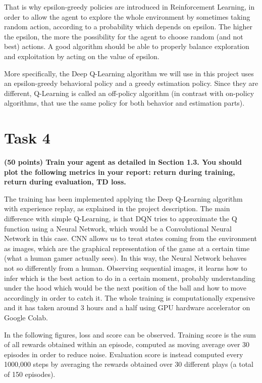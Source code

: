 \documentclass[12pt]{article}
\begin{document}
That is why epsilon-greedy policies are introduced in Reinforcement Learning, in order to allow the agent to explore the whole environment by sometimes taking random action, according to a probability which depends on epsilon. The higher the epsilon, the more the possibility for the agent to choose random (and not best) actions. A good algorithm should be able to properly balance exploration and exploitation by acting on the value of epsilon.

More specifically, the Deep Q-Learning algorithm we will use in this project uses an epsilon-greedy behavioral policy and a greedy estimation policy. Since they are different, Q-Learning is called an off-policy algorithm (in contrast with on-policy algorithms, that use the same policy for both behavior and estimation parts).



\clearpage
\section*{Task 4}

\textbf{(50 points) Train your agent as detailed in Section 1.3. You should plot the following metrics in your report: return during training, return during evaluation, TD loss.}

The training has been implemented applying the Deep Q-Learning algorithm with experience replay, as explained in the project description. The main difference with simple Q-Learning, is that DQN tries to approximate the Q function using a Neural Network, which would be a Convolutional Neural Network in this case. CNN allows us to treat states coming from the environment as images, which are the graphical representation of the game at a certain time (what a human gamer actually sees). In this way, the Neural Network behaves not so differently from a human. Observing sequential images, it learns how to infer which is the best action to do in a certain moment, probably understanding under the hood which would be the next position of the ball and how to move accordingly in order to catch it. The whole training is computationally expensive and it has taken around 3 hours and a half using GPU hardware accelerator on Google Colab.

In the following figures, loss and score can be observed. Training score is the sum of all rewards obtained within an episode, computed as moving average over 30 episodes in order to reduce noise. Evaluation score is instead computed every 1000,000 steps by averaging the rewards obtained over 30 different plays (a total of 150 episodes).
\end{document}
